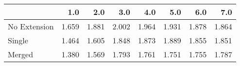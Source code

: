 \begin{tabular}{lrrrrrrr}
\toprule
{} &   1.0 &   2.0 &   3.0 &   4.0 &   5.0 &   6.0 &   7.0 \\
\midrule
No Extension & 1.659 & 1.881 & 2.002 & 1.964 & 1.931 & 1.878 & 1.864 \\
Single       & 1.464 & 1.605 & 1.848 & 1.873 & 1.889 & 1.855 & 1.851 \\
Merged       & 1.380 & 1.569 & 1.793 & 1.761 & 1.751 & 1.755 & 1.787 \\
\bottomrule
\end{tabular}
